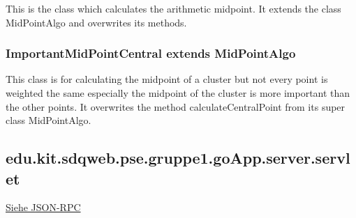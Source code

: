 	This is the class which calculates the arithmetic midpoint. It extends the class MidPointAlgo and overwrites its methods.	
	
	
	
	
	
	
	\subsubsection{ImportantMidPointCentral extends MidPointAlgo}
	
	This class is for calculating the midpoint of a cluster but not every point is weighted the same especially the midpoint of the cluster is more important than the other points. It overwrites the method calculateCentralPoint from its super class MidPointAlgo. 	
	
	

	\subsection{edu.kit.sdqweb.pse.gruppe1.goApp.server.servlet}	
	\hyperlink{Servlets}{Siehe JSON-RPC}
	\newpage
